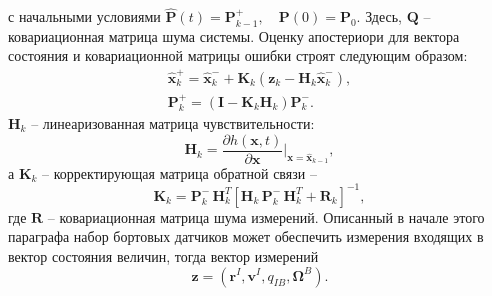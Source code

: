 с начальными условиями
$\hat{\bm{P}}(t) = \bm{P}_{k-1}^+, \quad \bm{P}(0) = \bm P_0$.
Здесь, $\bm Q$ -- ковариационная матрица шума системы. Оценку апостериори для вектора состояния и ковариационной матрицы ошибки строят следующим образом:
\begin{equation}
\begin{array}{l}
{\bm{\hat x}}_k^ +  = {\bm{\hat x}}_k^ -  + {{\bm{K}}_k}({{\bm{z}}_k} - {{\bm{H}}_k}{\bm{\hat x}}_k^ - ),\\
{\bm{P}}_k^ +  = \left( {{\bm{I}} - {{\bm{K}}_k}{{\bm{H}}_k}} \right){\bm{P}}_k^ - .
\end{array}
\end{equation}
${{\bm{H}}_k}$ -- линеаризованная матрица чувствительности:
\begin{equation}
{\bm{H}}_k = \frac{\partial {h}({\bm{x}},t)}{\partial {\bm{x}}} \Bigg|_{\bm x = {{\bm{\hat x}}_{k - 1}}},
\end{equation}
а ${{\bm{K}}_k}$ -- корректирующая матрица обратной связи --
$${{\bm{K}}_k} = {\bm{P}}_k^ - \,{\bm{H}}_k^T{\left[ {{{\bm{H}}_k}\,{\bm{P}}_k^ - \,{\bm{H}}_k^T + {{\bm{R}}_k}} \right]^{ - 1}},$$
где $\bm R$ -- ковариационная матрица шума измерений. Описанный в начале этого параграфа набор бортовых датчиков может обеспечить измерения входящих в вектор состояния величин, тогда вектор измерений
\begin{equation} \label{eq:ukf_mes}
\bm z = (\bm r^I, \bm v^I, q_{IB},\bm \Omega^B).
\end{equation}

